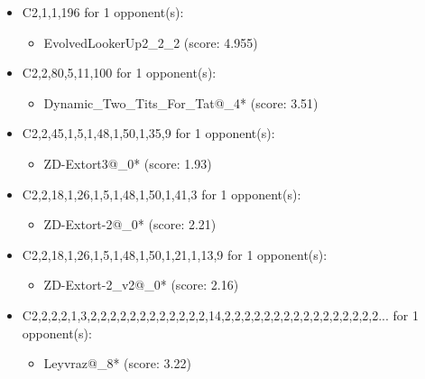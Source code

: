 \begin{appendices}
\begin{itemize}
    \item C2,1,1,196 for 1 opponent(s):
    \begin{multicols}{3}
         \begin{itemize}
            \item EvolvedLookerUp2\_2\_2 (score: 4.955)
        \end{itemize}
     \end{multicols}
     
    \item C2,2,80,5,11,100 for 1 opponent(s):
    \begin{multicols}{3}
         \begin{itemize}
            \item Dynamic\_Two\_Tits\_For\_Tat@\_4* (score: 3.51)
        \end{itemize}
     \end{multicols}
     
    \item C2,2,45,1,5,1,48,1,50,1,35,9 for 1 opponent(s):
    \begin{multicols}{3}
         \begin{itemize}
            \item ZD-Extort3@\_0* (score: 1.93)
        \end{itemize}
     \end{multicols}
     
    \item C2,2,18,1,26,1,5,1,48,1,50,1,41,3 for 1 opponent(s):
    \begin{multicols}{3}
         \begin{itemize}
            \item ZD-Extort-2@\_0* (score: 2.21)
        \end{itemize}
     \end{multicols}
     
    \item C2,2,18,1,26,1,5,1,48,1,50,1,21,1,13,9 for 1 opponent(s):
    \begin{multicols}{3}
         \begin{itemize}
            \item ZD-Extort-2\_v2@\_0* (score: 2.16)
        \end{itemize}
     \end{multicols}
     
    \item C2,2,2,2,1,3,2,2,2,2,2,2,2,2,2,2,2,2,14,2,2,2,2,2,2,2,2,2,2,2,2,2,2,2,2... for 1 opponent(s):
    \begin{multicols}{3}
         \begin{itemize}
            \item Leyvraz@\_8* (score: 3.22)
        \end{itemize}
     \end{multicols}
     

\end{itemize}
\end{appendices}
